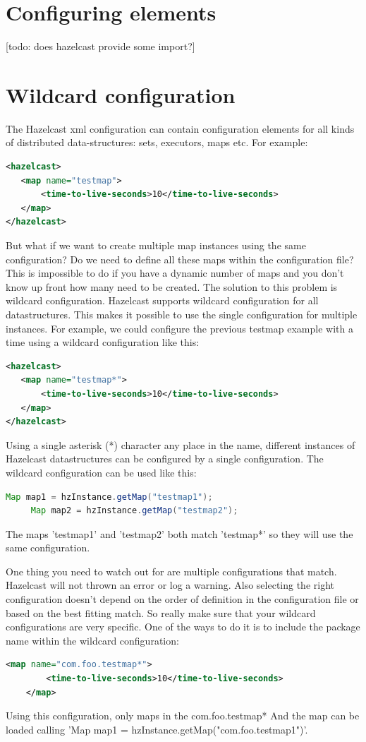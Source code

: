 \section{Configuring elements}
[todo: does hazelcast provide some import?]

\section{Wildcard configuration}
The Hazelcast xml configuration can contain configuration elements for all kinds of distributed data-structures: sets, executors, maps etc. For example:
\begin{lstlisting}[language=xml]
<hazelcast>
   <map name="testmap">
       <time-to-live-seconds>10</time-to-live-seconds>
   </map>
</hazelcast>
\end{lstlisting}
But what if we want to create multiple map instances using the same configuration? Do we need to define all these maps within the configuration file? This is impossible to do if you have a dynamic number of maps and you don't know up front how many need to be created. The solution to this problem is wildcard configuration. Hazelcast supports wildcard configuration for all datastructures. This makes it possible to use the single configuration for multiple instances. For example, we could configure the previous testmap example with a time using a wildcard configuration like this:
\begin{lstlisting}[language=xml]
<hazelcast>
   <map name="testmap*">
       <time-to-live-seconds>10</time-to-live-seconds>
   </map>
</hazelcast>
\end{lstlisting}
Using a single asterisk (*) character any place in the name, different instances of Hazelcast datastructures can be configured by a single configuration. The wildcard configuration can be used like this:
\begin{lstlisting}[language=java]
     Map map1 = hzInstance.getMap("testmap1");
     Map map2 = hzInstance.getMap("testmap2");
\end{lstlisting}
The maps 'testmap1' and 'testmap2' both match 'testmap*' so they will use the same configuration.

One thing you need to watch out for are multiple configurations that match. Hazelcast will not thrown an error or log a warning. Also selecting the right configuration doesn't depend on the order of definition in the configuration file or based on the best fitting match. So really make sure that your wildcard configurations are very specific. One of the ways to do it is to include the package name within the wildcard configuration:
\begin{lstlisting}[language=xml]
    <map name="com.foo.testmap*">
        <time-to-live-seconds>10</time-to-live-seconds>
    </map>
\end{lstlisting}
Using this configuration, only maps in the com.foo.testmap* 
And the map can be loaded calling 'Map map1 = hzInstance.getMap("com.foo.testmap1")'. 

